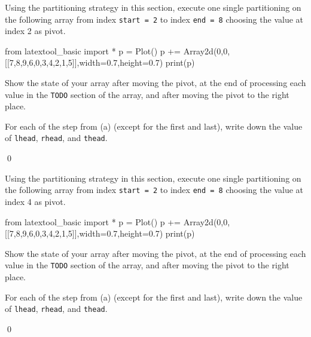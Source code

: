 \newpage
\begin{ex}
\begin{tightlist}
\item Using the partitioning strategy in this section,
execute one single partitioning on the following array
from index \verb!start = 2! to index \verb!end = 8!
choosing the value at index 2 as pivot.

\begin{python}
from latextool_basic import *
p = Plot()
p += Array2d(0,0,[[7,8,9,6,0,3,4,2,1,5]],width=0.7,height=0.7)
print(p)
\end{python}

Show the state of your array after moving the pivot, at the end of
processing each value in the \verb!TODO! section of the array,
and after moving the pivot to the right place.
\item For each of the step from (a) (except for the first and last),
write down the value of \verb!lhead!, \verb!rhead!, and \verb!thead!.
\end{tightlist}
\qed
\end{ex}

\newpage
\begin{ex}
\begin{tightlist}
\item Using the partitioning strategy in this section,
execute one single partitioning on the following array
from index \verb!start = 2! to index \verb!end = 8!
choosing the value at index 4 as pivot.

\begin{python}
from latextool_basic import *
p = Plot()
p += Array2d(0,0,[[7,8,9,6,0,3,4,2,1,5]],width=0.7,height=0.7)
print(p)
\end{python}

Show the state of your array after moving the pivot, at the end of
processing each value in the \verb!TODO! section of the array,
and after moving the pivot to the right place.
\item For each of the step from (a) (except for the first and last),
write down the value of \verb!lhead!, \verb!rhead!, and \verb!thead!.
\end{tightlist}
\qed
\end{ex}


